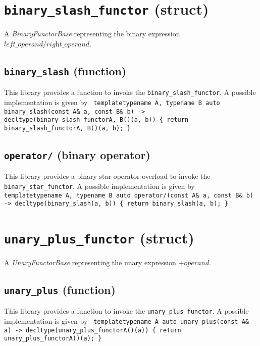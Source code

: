 \documentclass[oneside]{book}
\begin{document}
\section{\texttt{binary\_slash\_functor} (struct)}
A \textit{BinaryFunctorBase} representing the binary expression $\textit{left\_operand} / \textit{right\_operand}$.\newline

\subsection{\texttt{binary\_slash} (function)}
This library provides a function to invoke the \texttt{binary\_slash\_functor}.
A possible implementation is given by\newline
\texttt{
template\textlangle typename A, typename B\textrangle\newline
auto binary\_slash(const A\& a, const B\& b) -> decltype(binary\_slash\_functor\textlangle A, B\textrangle()(a, b))\newline
\{ return binary\_slash\_functor\textlangle A, B\textrangle()(a, b); \}
}

\subsection{\texttt{operator/} (binary operator)}
This library provides a binary star operator overload to invoke the \texttt{binary\_star\_functor}.
A possible implementation is given by\newline
\texttt{
template\textlangle typename A, typename B\textrangle\newline
auto operator/(const A\& a, const B\& b) -> decltype(binary\_slash(a, b))\newline
\{ return binary\_slash(a, b); \}
}

\section{\texttt{unary\_plus\_functor} (struct)}
A \textit{UnaryFunctorBase} representing the unary expression $+\textit{operand}$.\newline

\subsection{\texttt{unary\_plus} (function)}
This library provides a function to invoke the \texttt{unary\_plus\_functor}.
A possible implementation is given by\newline
\texttt{
template\textlangle typename A\textrangle\newline
auto unary\_plus(const A\& a) -> decltype(unary\_plus\_functor\textlangle A\textrangle()(a))\newline
\{ return unary\_plus\_functor\textlangle A\textrangle()(a); \}
}
\end{document}
